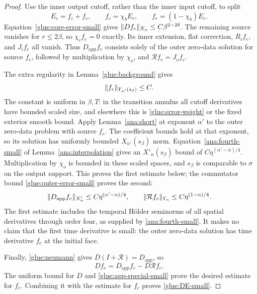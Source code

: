 \begin{proof}
Use the inner output cutoff, rather than the inner input cutoff, to
split
\[
 E_c=f_c+f_e,\qquad f_c=\chi_bE_c,\qquad f_e=(1-\chi_b)E_c.
\]
Equation~\eqref{glue:core-error-small} gives
$\lVert Df_c\rVert_{X_\alpha}\le C\beta^{2-2\delta}$.
The remaining source vanishes for $r\le2\beta$, so
$\chi_i f_e=0$ exactly.  Its inner extension, flat correction,
$R_i f_e$, and $J_i f_e$ all vanish.  Thus
$D_{\mathrm{app}}f_e$ consists solely of the outer zero-data solution
for source $f_e$, followed by multiplication by $\chi_o$, and
$\mathcal R f_e=J_o f_e$.

The extra regularity in Lemma~\ref{glue:background} gives
\begin{equation}\label{glue:outer-error-high}
 \lVert f_e\rVert_{Y_{\alpha'}(s_\beta)}\le C.
\end{equation}
The constant is uniform in $\beta,T$: in the transition annulus all
cutoff derivatives have bounded scaled size, and elsewhere this is
\eqref{glue:error-weight} or the fixed exterior smooth bound.
Apply Lemma~\ref{ana:short} at exponent $\alpha'$ to the outer
zero-data problem with source $f_e$.  The coefficient bounds hold at
that exponent, so its solution has uniformly bounded
$X_{\alpha'}(s_\beta)$ norm.  Equation~\eqref{ana:fourth-small} of
Lemma~\ref{ana:interpolation} gives an $X'_\alpha(s_\beta)$ bound
of $C\eta^{(\alpha'-\alpha)/4}$.  Multiplication by $\chi_o$ is
bounded in these scaled spaces, and $s_\beta$ is comparable to
$\sigma$ on the output support.  This proves the first estimate below;
the commutator bound \eqref{glue:outer-error-small} proves the second:
\begin{equation}\label{glue:app-special-small}
 \lVert D_{\mathrm{app}}f_e\rVert_{X'_\alpha}
 \le C\eta^{(\alpha'-\alpha)/4},\qquad
 \lVert \mathcal Rf_e\rVert_{Y_\alpha}
 \le C\eta^{(1-\alpha)/4}.
\end{equation}
The first estimate includes the temporal H\"older seminorms of all
spatial derivatives through order four, as supplied by
\eqref{ana:fourth-small}.  It makes no claim that the first time
derivative is small: the outer zero-data solution has time derivative
$f_e$ at the initial face.

Finally, \eqref{glue:neumann} gives
$D(I+\mathcal R)=D_{\mathrm{app}}$, so
\begin{equation}\label{glue:special-neumann-identity}
 Df_e=D_{\mathrm{app}}f_e-D\mathcal Rf_e.
\end{equation}
The uniform bound for $D$ and
\eqref{glue:app-special-small} prove the desired estimate for $f_e$.
Combining it with the estimate for $f_c$ proves
\eqref{glue:DE-small}.
\end{proof}

